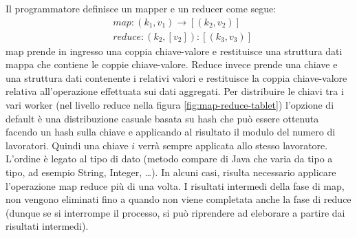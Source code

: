 \documentclass[italian,10pt,a4paper]{report}
\begin{document}
	Il programmatore definisce un mapper e un reducer come segue:
	\begin{align*}
		&map \colon (k_1,v_1)\xrightarrow{}\left[(k_2,v_2)\right]\\
		&reduce \colon (k_2,\left[v_2\right]) \colon \left[(k_3,v_3)\right]
	\end{align*}
	map prende in ingresso una coppia chiave-valore e restituisce una struttura dati mappa che contiene le coppie chiave-valore. Reduce invece prende una chiave e una struttura dati contenente i relativi valori e restituisce la coppia chiave-valore relativa all'operazione effettuata sui dati aggregati.
	Per distribuire le chiavi tra i vari worker (nel livello reduce nella figura \ref{fig:map-reduce-tablet}) l'opzione di default è una distribuzione casuale basata su hash che può essere ottenuta facendo un hash sulla chiave e applicando al risultato il modulo del numero di lavoratori. Quindi una chiave $i$ verrà sempre applicata allo stesso lavoratore. L'ordine è legato al tipo di dato (metodo compare di Java che varia da tipo a tipo, ad esempio String, Integer, \dots). In alcuni casi, risulta necessario applicare l'operazione map reduce più di una volta. I risultati intermedi della fase di map, non vengono eliminati fino a quando non viene completata anche la fase di reduce (dunque se si interrompe il processo, si può riprendere ad eleborare a partire dai risultati intermedi).
	\newpage
\end{document}
